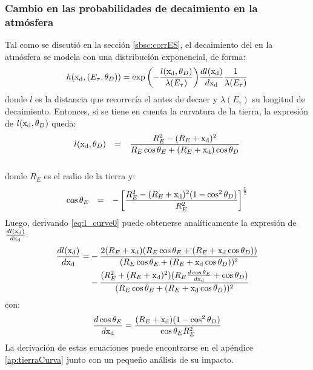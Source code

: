 	\subsubsection{Cambio en las probabilidades de decaimiento en la atm\'osfera}
	Tal como se discuti\'o en la secci\'on \ref{sbsc:corrES}, el decaimiento del \tauon{} en la atm\'osfera se modela con una distribuci\'on exponencial, de forma:
	\begin{equation}
		h({\rm x_d},(E_\tau,\theta_D))=
		\exp{\left(
		-\frac{l({\rm x_d},\theta_D)}{\lambda(E_\tau)}
		\right)}
		\frac{dl({\rm x_d})}{d{\rm x_d}}
		\frac{1}{\lambda(E_\tau)}
		\label{eq:decayTayRadio}
	\end{equation}
	donde $l$ es la distancia que recorrer\'ia el \tauon{} antes de decaer y $\lambda(E_\tau)$ su longitud de decaimiento.
	Entonces, si se tiene en cuenta la curvatura de la tierra, la expresi\'on de $l({\rm x_d},\theta_D)$ queda:
	\begin{equation}
		\begin{array}{rcl}
		l({\rm x_d},\theta_D) & = & \dfrac{R_E^2-(R_E+{\rm x_d})^2}{R_E \cos \theta_E + (R_E+{\rm x_d}) \cos \theta_D}\\
		&&\\
		\end{array}
		\label{eq:l_curve0}
	\end{equation}
	donde $R_E$ es el radio de la tierra y:
	\begin{equation}
		\begin{array}{rcl}
		\cos \theta_E & = & - \left[ \dfrac{R_E^2 - (R_E+{\rm x_d})^2 (1-\cos^2 \theta_D)}{R_E^2} \right]^{\frac{1}{2}} \\ 
		\end{array}
		\label{eq:te_td0}
	\end{equation}
	Luego, derivando \ref{eq:l_curve0} puede obtenerse anal\'iticamente la expresi\'on de $\frac{dl({\rm x_d})}{d{\rm x_d}}$:
	\begin{equation}
	\begin{aligned}
		\frac{dl({\rm x_d})}{d{\rm x_d}}
		=&-
		\frac{
		2(R_E+{\rm x_d})
		(R_E\cos{\theta_E}+(R_E+{\rm x_d}\cos{\theta_D}))
		}{
		(R_E\cos{\theta_E}+(R_E+{\rm x_d}\cos{\theta_D}))^2
		}\\
		&-
		\frac{(R_E^2+(R_E+{\rm x_d})^2)(R_E\frac{d\cos{\theta_E}}{d{\rm x_d}}+\cos{\theta_D})
		}{
		(R_E\cos{\theta_E}+(R_E+{\rm x_d}\cos{\theta_D}))^2
		}
	\end{aligned}
	\end{equation}
	con:
	\begin{equation}
	\frac{d\cos{\theta_E}}{d{\rm x_d}}
	=
	\frac{
	(R_E+{\rm x_d})
	(1-\cos^2\theta_D)
	}{\cos{\theta_E}R_E^2
	}
	\end{equation}
	La derivaci\'on de estas ecuaciones puede encontrarse en el ap\'endice \ref{ap:tierraCurva} junto con un peque\~no an\'alisis de su impacto.
	
